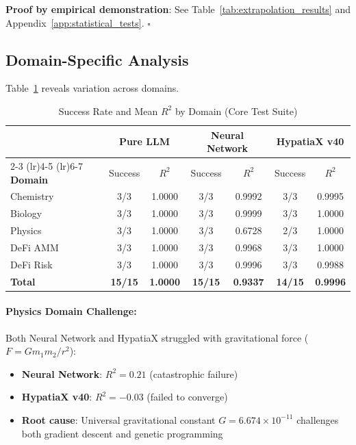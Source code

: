 \textbf{Proof by empirical demonstration}: See Table~\ref{tab:extrapolation_results} and Appendix~\ref{app:statistical_tests}. $\square$


\subsection{Domain-Specific Analysis}

Table~\ref{tab:domain_breakdown} reveals variation across domains.

\begin{table}[htbp]
\centering
\caption{Success Rate and Mean $R^2$ by Domain (Core Test Suite)}
\label{tab:domain_breakdown}
\small
\begin{tabular}{lcccccc}
\toprule
& \multicolumn{2}{c}{\textbf{Pure LLM}} & \multicolumn{2}{c}{\textbf{Neural Network}} & \multicolumn{2}{c}{\textbf{HypatiaX v40}} \\
\cmidrule(lr){2-3} \cmidrule(lr){4-5} \cmidrule(lr){6-7}
\textbf{Domain} & Success & $R^2$ & Success & $R^2$ & Success & $R^2$ \\
\midrule
Chemistry   & 3/3 & 1.0000 & 3/3 & 0.9992 & 3/3 & 0.9995 \\
Biology     & 3/3 & 1.0000 & 3/3 & 0.9999 & 3/3 & 1.0000 \\
Physics     & 3/3 & 1.0000 & 3/3 & 0.6728 & 2/3 & 1.0000 \\
DeFi AMM    & 3/3 & 1.0000 & 3/3 & 0.9968 & 3/3 & 1.0000 \\
DeFi Risk   & 3/3 & 1.0000 & 3/3 & 0.9996 & 3/3 & 0.9988 \\
\midrule
\textbf{Total} & \textbf{15/15} & \textbf{1.0000} & \textbf{15/15} & \textbf{0.9337} & \textbf{14/15} & \textbf{0.9996} \\
\bottomrule
\end{tabular}
\end{table}

\paragraph{Physics Domain Challenge:} Both Neural Network and HypatiaX struggled with gravitational force ($F = Gm_1m_2/r^2$):
\begin{itemize}
\item \textbf{Neural Network}: $R^2 = 0.21$ (catastrophic failure)
\item \textbf{HypatiaX v40}: $R^2 = -0.03$ (failed to converge)
\item \textbf{Root cause}: Universal gravitational constant $G = 6.674 \times 10^{-11}$ challenges both gradient descent and genetic programming
\end{itemize}

